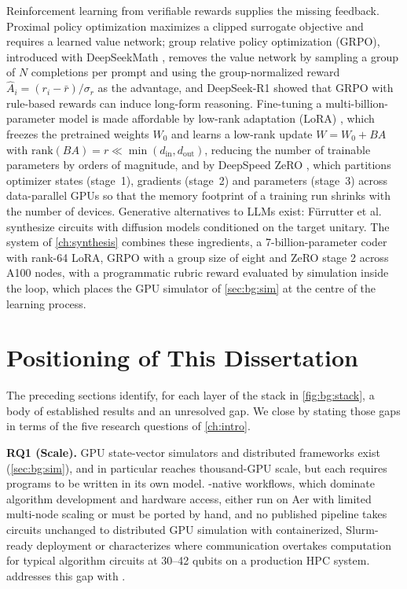 Reinforcement learning from verifiable rewards supplies the missing feedback. Proximal policy optimization \cite{schulman2017ppo} maximizes a clipped surrogate objective and requires a learned value network; group relative policy optimization (GRPO), introduced with DeepSeekMath \cite{shao2024deepseekmath}, removes the value network by sampling a group of $N$ completions per prompt and using the group-normalized reward $\hat{A}_i=(r_i-\bar{r})/\sigma_r$ as the advantage, and DeepSeek-R1 \cite{deepseek2025r1} showed that GRPO with rule-based rewards can induce long-form reasoning. Fine-tuning a multi-billion-parameter model is made affordable by low-rank adaptation (LoRA) \cite{hu2022lora}, which freezes the pretrained weights $W_0$ and learns a low-rank update $W=W_0+BA$ with $\mathrm{rank}(BA)=r\ll\min(d_{\mathrm{in}},d_{\mathrm{out}})$, reducing the number of trainable parameters by orders of magnitude, and by DeepSpeed ZeRO \cite{rajbhandari2020zero}, which partitions optimizer states (stage~1), gradients (stage~2) and parameters (stage~3) across data-parallel GPUs so that the memory footprint of a training run shrinks with the number of devices. Generative alternatives to LLMs exist: F{\"u}rrutter et al. \cite{furrutter2024genqc} synthesize circuits with diffusion models conditioned on the target unitary. The \rubriq{} system of \cref{ch:synthesis} \cite{guo2026rubriq} combines these ingredients, a 7-billion-parameter coder with rank-64 LoRA, GRPO with a group size of eight and ZeRO stage 2 across A100 nodes, with a programmatic rubric reward evaluated by \cudaq{} simulation inside the loop, which places the GPU simulator of \cref{sec:bg:sim} at the centre of the learning process.

\section{Positioning of This Dissertation}\label{sec:bg:summary}

The preceding sections identify, for each layer of the stack in \cref{fig:bg:stack}, a body of established results and an unresolved gap. We close by stating those gaps in terms of the five research questions of \cref{ch:intro}.

\textbf{RQ1 (Scale).} GPU state-vector simulators and distributed frameworks exist (\cref{sec:bg:sim}), and \cudaq{} in particular reaches thousand-GPU scale, but each requires programs to be written in its own model. \qiskit{}-native workflows, which dominate algorithm development and hardware access, either run on Aer with limited multi-node scaling or must be ported by hand, and no published pipeline takes \qiskit{} circuits unchanged to distributed GPU simulation with containerized, Slurm-ready deployment or characterizes where communication overtakes computation for typical algorithm circuits at 30--42 qubits on a production HPC system.  addresses this gap with \qgear{} \cite{guo2025qgear,guo2025qgearsoftware}.

